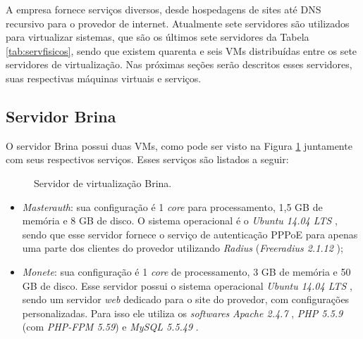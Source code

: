 A empresa fornece serviços diversos, desde hospedagens de sites até \ac{DNS} recursivo para o provedor de internet. Atualmente sete servidores 
são utilizados para virtualizar sistemas, que são os últimos sete servidores da Tabela \ref{tab:servfisicos}, sendo que existem quarenta e seis 
\ac{VM}s distribuídas entre os sete servidores de virtualização. Nas próximas seções serão descritos esses servidores, suas respectivas 
máquinas virtuais e serviços.

\subsection{Servidor Brina}
\label{section:serv_brina}

O servidor Brina possui duas \ac{VM}s, como pode ser visto na Figura \ref{fig:servidor_brina} juntamente com seus respectivos serviços. 
Esses serviços são listados a seguir:

\begin{figure}[h!]
 \centering
 \caption{Servidor de virtualização Brina.}
 \label{fig:servidor_brina}
\end{figure}

\begin{itemize}
 \item \textit{Masterauth}: sua configuração é 1 \textit{core} para processamento, 1,5 GB de memória e 8 GB de disco. O sistema operacional é o 
 \textit{Ubuntu 14.04 \ac{LTS}} \cite{ubuntu}, sendo que esse servidor fornece o serviço de autenticação \ac{PPPoE} para apenas uma parte dos 
 clientes do provedor utilizando \textit{Radius} (\textit{Freeradius 2.1.12} \cite{freeradius});
 
 \item \textit{Monete}: sua configuração é 1 \textit{core} de processamento, 3 GB de memória e 50 GB de disco. Esse servidor possui o 
 sistema operacional \textit{Ubuntu 14.04 \ac{LTS}} \cite{ubuntu}, sendo um servidor \textit{web} dedicado para o site do provedor, com 
 configurações personalizadas. Para isso ele utiliza os \textit{softwares} \textit{Apache 2.4.7} \cite{apache}, \textit{\ac{PHP} 5.5.9} \cite{php} 
 (com \textit{PHP-FPM 5.59}) e \textit{MySQL 5.5.49} \cite{mysql}.
\end{itemize}


